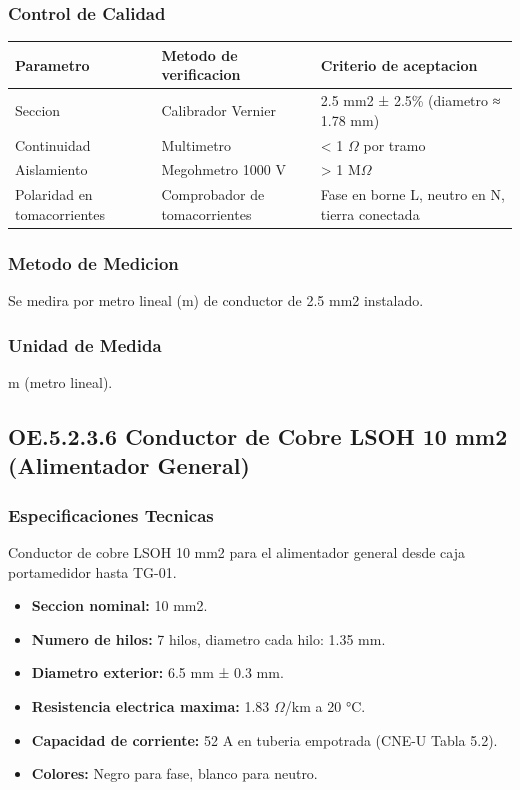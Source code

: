 \subsubsection{Control de Calidad}

\begin{longtable}{L{4.5cm} L{4.5cm} L{4.5cm}}
\toprule
\textbf{Parametro} & \textbf{Metodo de verificacion} & \textbf{Criterio de aceptacion} \\
\midrule
Seccion & Calibrador Vernier & 2.5 mm2 ± 2.5\% (diametro ≈ 1.78 mm) \\
Continuidad & Multimetro & < 1 $\Omega$ por tramo \\
Aislamiento & Megohmetro 1000 V & > 1 M$\Omega$ \\
Polaridad en tomacorrientes & Comprobador de tomacorrientes & Fase en borne L, neutro en N, tierra conectada \\
\bottomrule
\end{longtable}

\subsubsection{Metodo de Medicion}

Se medira por metro lineal (m) de conductor de 2.5 mm2 instalado.

\subsubsection{Unidad de Medida}

m (metro lineal).

\subsection{OE.5.2.3.6 Conductor de Cobre LSOH 10 mm2 (Alimentador General)}

\subsubsection{Especificaciones Tecnicas}

Conductor de cobre LSOH 10 mm2 para el alimentador general desde caja portamedidor hasta TG-01.

\begin{itemize}[nosep]
  \item \textbf{Seccion nominal:} 10 mm2.
  \item \textbf{Numero de hilos:} 7 hilos, diametro cada hilo: 1.35 mm.
  \item \textbf{Diametro exterior:} 6.5 mm ± 0.3 mm.
  \item \textbf{Resistencia electrica maxima:} 1.83 $\Omega$/km a 20 °C.
  \item \textbf{Capacidad de corriente:} 52 A en tuberia empotrada (CNE-U Tabla 5.2).
  \item \textbf{Colores:} Negro para fase, blanco para neutro.
\end{itemize}


